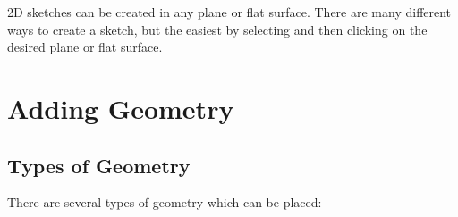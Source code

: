\cbstart
{}

2D sketches can be created in any plane or flat surface. There are many different ways to create a sketch, but the easiest by selecting  and then clicking on the desired plane or flat surface.
\cbend
\section{Adding Geometry}

\subsection{Types of Geometry}

\cbstart
{}

There are several types of geometry which can be placed:

